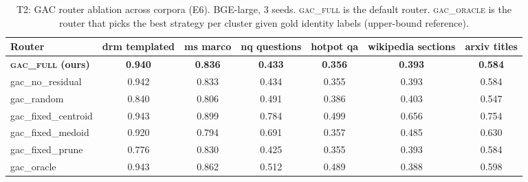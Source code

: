 \begin{table}[t]
\centering
\small
\caption{T2: GAC router ablation across corpora (E6). BGE-large, 3 seeds. \textsc{gac\_full} is the default router. \textsc{gac\_oracle} is the router that picks the best strategy per cluster given gold identity labels (upper-bound reference).}
\label{tab:t2}
\begin{tabular}{lcccccc}
\toprule
Router & drm templated & ms marco & nq questions & hotpot qa & wikipedia sections & arxiv titles \\
\midrule
\textbf{\textsc{gac\_full} (ours)} & \textbf{0.940} & \textbf{0.836} & \textbf{0.433} & \textbf{0.356} & \textbf{0.393} & \textbf{0.584} \\
gac\_no\_residual & 0.942 & 0.833 & 0.434 & 0.355 & 0.393 & 0.584 \\
gac\_random & 0.840 & 0.806 & 0.491 & 0.386 & 0.403 & 0.547 \\
gac\_fixed\_centroid & 0.943 & 0.899 & 0.784 & 0.499 & 0.656 & 0.754 \\
gac\_fixed\_medoid & 0.920 & 0.794 & 0.691 & 0.357 & 0.485 & 0.630 \\
gac\_fixed\_prune & 0.776 & 0.830 & 0.425 & 0.355 & 0.393 & 0.584 \\
gac\_oracle & 0.943 & 0.862 & 0.512 & 0.489 & 0.388 & 0.598 \\
\bottomrule
\end{tabular}
\end{table}
